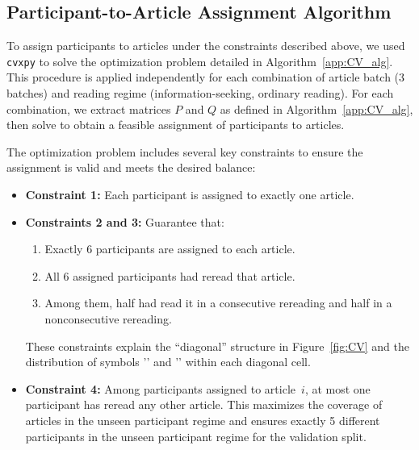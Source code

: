 \subsection{Participant-to-Article Assignment Algorithm}
\label{app:CV_alg_section}

To assign participants to articles under the constraints described above, we used \texttt{cvxpy} \cite{diamond2016cvxpy} to solve the optimization problem detailed in Algorithm~\ref{app:CV_alg}. This procedure is applied independently for each combination of article batch (3 batches) and reading regime (information-seeking, ordinary reading). For each combination, we extract matrices \(P\) and \(Q\) as defined in Algorithm~\ref{app:CV_alg}, then solve to obtain a feasible assignment of participants to articles.

The optimization problem includes several key constraints to ensure the assignment is valid and meets the desired balance:
\begin{itemize}
    \item \textbf{Constraint 1:} Each participant is assigned to exactly one article.
    \item \textbf{Constraints 2 and 3:} Guarantee that:
    \begin{enumerate}
        \item Exactly 6 participants are assigned to each article.
        \item All 6 assigned participants had reread that article.
        \item Among them, half had read it in a consecutive rereading and half in a nonconsecutive rereading.
    \end{enumerate}
    These constraints explain the “diagonal” structure in Figure~\ref{fig:CV} and the distribution of symbols '{\scriptsize \protect\divorced}' and '{\scriptsize \protect\unmarried}' within each diagonal cell.
    \item \textbf{Constraint 4:} Among participants assigned to article~\(i\), at most one participant has reread any other article. This maximizes the coverage of articles in the unseen participant regime and ensures exactly 5 different participants in the unseen participant regime for the validation split.
\end{itemize}

